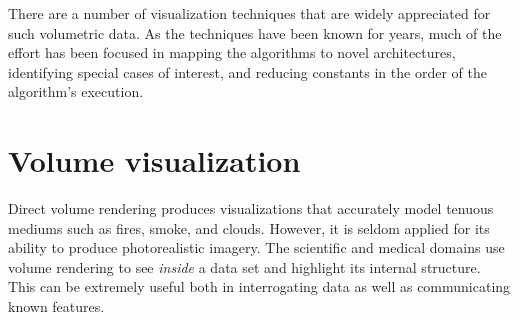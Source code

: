 

There are a number of visualization techniques that are widely
appreciated for such volumetric data.  As the techniques have been
known for years, much of the effort has been focused in mapping the
algorithms to novel architectures, identifying special cases of
interest, and reducing constants in the order of the algorithm's
execution.


%
%

\section{Volume visualization}


Direct volume rendering produces visualizations that accurately model
tenuous mediums such as fires, smoke, and clouds.  However, it is
seldom applied for its ability to produce photorealistic imagery.  The
scientific and medical domains use volume rendering to see
\emph{inside} a data set and highlight its internal structure.
This can be extremely useful both in interrogating data as well as
communicating known features.


